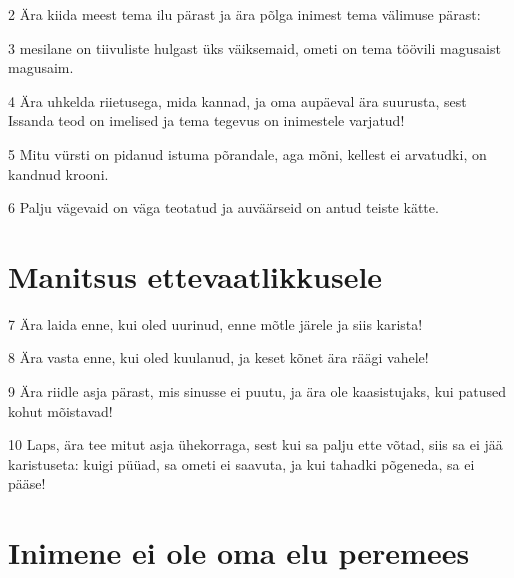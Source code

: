 \par 2 Ära kiida meest tema ilu pärast ja ära põlga inimest tema välimuse pärast:
\par 3 mesilane on tiivuliste hulgast üks väiksemaid, ometi on tema töövili magusaist magusaim.
\par 4 Ära uhkelda riietusega, mida kannad, ja oma aupäeval ära suurusta, sest Issanda teod on imelised ja tema tegevus on inimestele varjatud!
\par 5 Mitu vürsti on pidanud istuma põrandale, aga mõni, kellest ei arvatudki, on kandnud krooni.
\par 6 Palju vägevaid on väga teotatud ja auväärseid on antud teiste kätte.

\section*{Manitsus ettevaatlikkusele}

\par 7 Ära laida enne, kui oled uurinud, enne mõtle järele ja siis karista!
\par 8 Ära vasta enne, kui oled kuulanud, ja keset kõnet ära räägi vahele!
\par 9 Ära riidle asja pärast, mis sinusse ei puutu, ja ära ole kaasistujaks, kui patused kohut mõistavad!
\par 10 Laps, ära tee mitut asja ühekorraga, sest kui sa palju ette võtad, siis sa ei jää karistuseta: kuigi püüad, sa ometi ei saavuta, ja kui tahadki põgeneda, sa ei pääse!

\section*{Inimene ei ole oma elu peremees}

